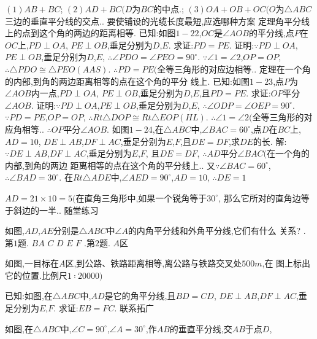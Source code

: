 \documentclass[cn,blue,12pt]{elegantbook}
\begin{document}
\begin{liti}[resume]
\(( 1) AB + BC\);
\(( 2) AD + BC( D \)为\( BC \)的中点.;
\(( 3) OA + OB + OC( O\)为\( \triangle ABC \)三边的垂直平分线的交点.. 
要使铺设的光缆长度最短,应选哪种方案
定理角平分线上的点到这个角的两边的距离相等. 
已知:如图\( 1-22\),\( OC \)是\( \angle  AOB \)的平分线,点\( P \)在\( OC \)上,\( PD \perp OA\),
\(PE \perp OB\),垂足分别为\( D\),\( E\). 
求证:\( PD = PE\). 
证明:\( \because PD \perp OA\),\( PE \perp OB\),垂足分别为\( D\),\( E\),
\( \therefore \angle  PDO = \angle  PEO = 90 ^\circ \). 
\( \because \angle  1 = \angle  2\),\( OP = OP\),
\( \therefore \triangle PDO \cong   \triangle PEO( AAS) \). 
\( \therefore PD = PE( \)全等三角形的对应边相等.. 
定理在一个角的内部,到角的两边距离相等的点在这个角的平分
线上. 
已知:如图\( 1-23\),点\( P \)为\( \angle  AOB \)内一点,\( PD \perp OA\),
\(PE \perp OB\),垂足分别为\( D\),\( E\),且\( PD = PE\). 
求证:\( OP \)平分\( \angle  AOB\). 
证明:\( \because PD \perp OA\),\( PE \perp OB\),垂足分别为\( D\),\( E\),
\( \therefore \angle  ODP = \angle  OEP = 90 ^\circ \). 
\( \because PD = PE\),\( OP = OP\),
\( \therefore Rt \triangle DOP \cong  Rt \triangle EOP( HL) \). 
\( \therefore \angle  1 = \angle 2( \)全等三角形的对应角相等.. 
\( \therefore OP \)平分\( \angle AOB\). 
如图\( 1-24\),在\( \triangle ABC \)中,\( \angle  BAC = 60 ^\circ \),点\( D \)在\( BC \)上,\( AD = 10\),
\(DE \perp AB\),\( DF \perp AC\),垂足分别为\( E\),\( F\),且\( DE = DF\),求\( DE \)的长. 
解:\( \because DE \perp AB\),\( DF \perp AC\),垂足分别为\( E\),\( F\),
且\( DE = DF\),
\( \therefore AD \)平分\( \angle  BAC( \)在一个角的内部,到角的两边
距离相等的点在这个角的平分线上.. 
又\( \because \angle  BAC = 60 ^\circ \),
\( \therefore \angle  BAD = 30 ^\circ \). 
在\( Rt \triangle ADE \)中,\( \angle  AED = 90 ^\circ \),\( AD = 10\),
\( \therefore DE= 1\)
\item \( AD = 21 \times 10 = 5( \)在直角三角形中,如果一个锐角等于\(30 ^\circ \),
那么它所对的直角边等于斜边的一半.. 
随堂练习
\item 如图,\( AD\),\( AE \)分别是\( \triangle ABC \)中\( \angle  A \)的内角平分线和外角平分线,它们有什么
关系?
.第\( 1 \)题.
\(B A\)
\(C\)
\(D\)
\(E\)
\(F\)
.第\( 2 \)题.
\(A \)区
\item 如图,一目标在\( A \)区,到公路、铁路距离相等,离公路与铁路交叉处\( 500 m\),在
图上标出它的位置.比例尺\( 1∶ 20 000)\)
\item 已知:如图,在\( \triangle ABC \)中,\( AD \)是它的角平分线,且\( BD = CD\),
\(DE \perp AB\),\( DF \perp AC\),垂足分别为\( E\),\( F\). 
求证:\( EB = FC\). 
联系拓广
\item 如图,在\( \triangle ABC \)中,\( \angle  C = 90 ^\circ \),\( \angle  A = 30 ^\circ \),作\( AB \)的垂直平分线,交\( AB \)于点\( D\),

\end{liti}
\end{document}
